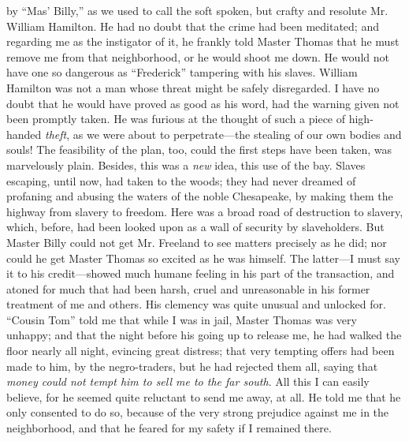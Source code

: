 by ``Mas' Billy,'' as we used to call the soft spoken, but crafty and
resolute Mr. William Hamilton. He had no doubt that the crime had been
meditated; and regarding me as the instigator of it, he frankly told
Master Thomas that he must remove me from that neighborhood, or he would
shoot me down. He would not have one so dangerous as ``Frederick''
tampering with his slaves. William Hamilton was not a man whose threat
might be safely disregarded. I have no doubt that he would have proved
as good as his word, had the warning given not been promptly taken. He
was furious at the thought of such a piece of high-handed \emph{theft},
as we were about to perpetrate---the stealing of our own bodies and
souls! The feasibility of the plan, too,
{\protect\hypertarget{306}{}{}}could the first steps have been taken,
was marvelously plain. Besides, this was a \emph{new} idea, this use of
the bay. Slaves escaping, until now, had taken to the woods; they had
never dreamed of profaning and abusing the waters of the noble
Chesapeake, by making them the highway from slavery to freedom. Here was
a broad road of destruction to slavery, which, before, had been looked
upon as a wall of security by slaveholders. But Master Billy could not
get Mr. Freeland to see matters precisely as he did; nor could he get
Master Thomas so excited as he was himself. The latter---I must say it
to his credit---showed much humane feeling in his part of the
transaction, and atoned for much that had been harsh, cruel and
unreasonable in his former treatment of me and others. His clemency was
quite unusual and unlocked for. ``Cousin Tom'' told me that while I was
in jail, Master Thomas was very unhappy; and that the night before his
going up to release me, he had walked the floor nearly all night,
evincing great distress; that very tempting offers had been made to him,
by the negro-traders, but he had rejected them all, saying that
\emph{money could not tempt him to sell me to the far south}. All this I
can easily believe, for he seemed quite reluctant to send me away, at
all. He told me that he only consented to do so, because of the very
strong prejudice against me in the neighborhood, and that he feared for
my safety if I remained there.

